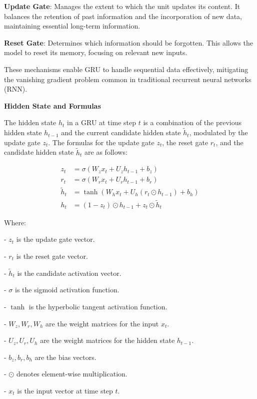 \documentclass{ieeeojies}
\begin{document}
\textbf{Update Gate}: Manages the extent to which the unit updates its content. It balances the retention of past information and the incorporation of new data, maintaining essential long-term information.

\textbf{Reset Gate}: Determines which information should be forgotten. This allows the model to reset its memory, focusing on relevant new inputs.

These mechanisms enable GRU to handle sequential data effectively, mitigating the vanishing gradient problem common in traditional recurrent neural networks (RNN).


\textbf{Hidden State and Formulas}\cite{b18}

The hidden state \( h_t \) in a GRU at time step \( t \) is a combination of the previous hidden state \( h_{t-1} \) and the current candidate hidden state \( \tilde{h}_t \), modulated by the update gate \( z_t \). The formulas for the update gate \( z_t \), the reset gate \( r_t \), and the candidate hidden state \( \tilde{h}_t \) are as follows\cite{}:

\begin{align}
z_t &= \sigma(W_z x_t + U_z h_{t-1} + b_z) \\
r_t &= \sigma(W_r x_t + U_r h_{t-1} + b_r) \\
\tilde{h}_t &= \tanh(W_h x_t + U_h (r_t \odot h_{t-1}) + b_h) \\
h_t &= (1 - z_t) \odot h_{t-1} + z_t \odot \tilde{h}_t
\end{align}

Where:

- \( z_t \) is the update gate vector.

- \( r_t \) is the reset gate vector.

- \( \tilde{h}_t \) is the candidate activation vector.

- \( \sigma \) is the sigmoid activation function.

- \( \tanh \) is the hyperbolic tangent activation function.

- \( W_z, W_r, W_h \) are the weight matrices for the input \( x_t \).

- \( U_z, U_r, U_h \) are the weight matrices for the hidden state \( h_{t-1} \).

- \( b_z, b_r, b_h \) are the bias vectors.

- \( \odot \) denotes element-wise multiplication.

- \( x_t \) is the input vector at time step \( t \).
\end{document}
